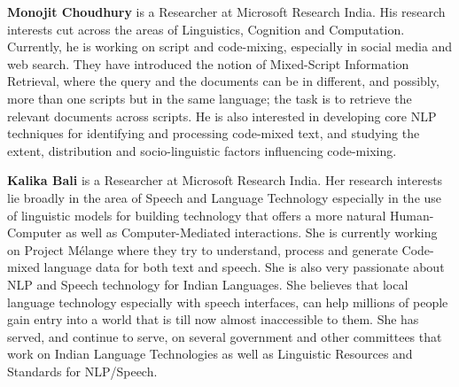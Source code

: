 \begin{bio}

\textbf{Monojit Choudhury} is a Researcher at Microsoft Research India. His research interests cut across the areas of Linguistics, Cognition and Computation. Currently, he is working on script and code-mixing, especially in social media and web search. They have introduced the notion of Mixed-Script Information Retrieval, where the query and the documents can be in different, and possibly, more than one scripts but in the same language; the task is to retrieve the relevant documents across scripts. He is also interested in developing core NLP techniques for identifying and processing code-mixed text, and studying the extent, distribution and socio-linguistic factors influencing code-mixing.


\textbf{Kalika Bali} is a Researcher at Microsoft Research India. Her research interests lie broadly in the area of Speech and Language Technology especially in the use of linguistic models for building technology that offers a more natural Human-Computer as well as Computer-Mediated interactions. She is currently working on Project M\'elange where they try to understand, process and generate Code-mixed language data for both text and speech. She is also very passionate about NLP and Speech technology for Indian Languages. She believes that local language
technology especially with speech interfaces, can help millions of people gain entry into a world that is till now almost inaccessible to them. She has served, and continue to serve, on several government and other committees that work on Indian Language Technologies as well as Linguistic Resources and Standards for NLP/Speech.


\end{bio}

